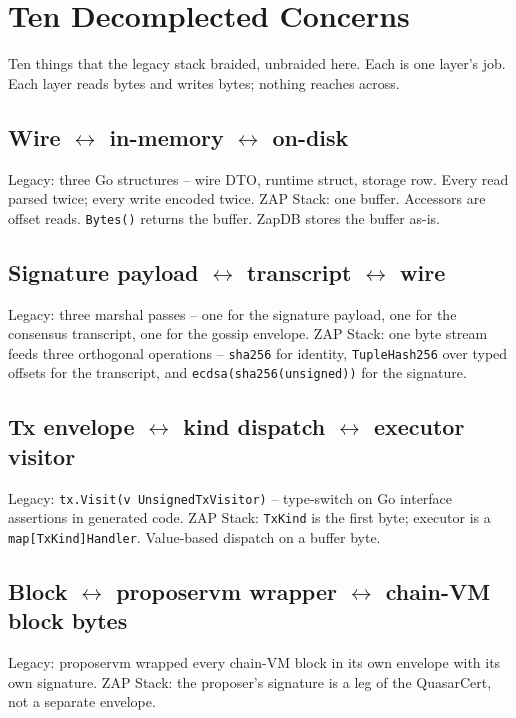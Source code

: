 \section{Ten Decomplected Concerns}

Ten things that the legacy stack braided, unbraided here. Each is one
layer's job. Each layer reads bytes and writes bytes; nothing reaches
across.

\subsection{Wire $\leftrightarrow$ in-memory $\leftrightarrow$ on-disk}

Legacy: three Go structures -- wire DTO, runtime struct, storage row.
Every read parsed twice; every write encoded twice.
ZAP Stack: one buffer. Accessors are offset reads. \texttt{Bytes()}
returns the buffer. ZapDB stores the buffer as-is.

\subsection{Signature payload $\leftrightarrow$ transcript $\leftrightarrow$ wire}

Legacy: three marshal passes -- one for the signature payload, one
for the consensus transcript, one for the gossip envelope.
ZAP Stack: one byte stream feeds three orthogonal operations --
\texttt{sha256} for identity, \texttt{TupleHash256} over typed offsets
for the transcript, and \texttt{ecdsa(sha256(unsigned))} for the
signature.

\subsection{Tx envelope $\leftrightarrow$ kind dispatch $\leftrightarrow$ executor visitor}

Legacy: \texttt{tx.Visit(v UnsignedTxVisitor)} -- type-switch on Go
interface assertions in generated code.
ZAP Stack: \texttt{TxKind} is the first byte; executor is a
\texttt{map[TxKind]Handler}. Value-based dispatch on a buffer byte.

\subsection{Block $\leftrightarrow$ proposervm wrapper $\leftrightarrow$ chain-VM block bytes}

Legacy: proposervm wrapped every chain-VM block in its own envelope
with its own signature.
ZAP Stack: the proposer's signature is a leg of the QuasarCert, not a
separate envelope.

